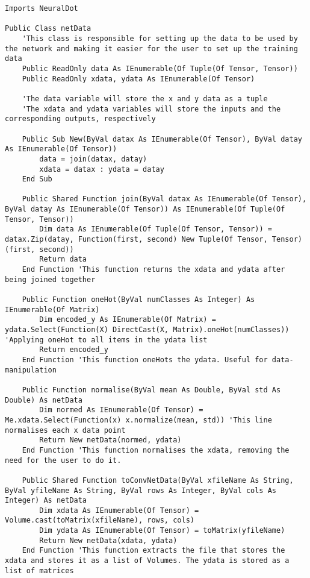 \begin{verbatim}
Imports NeuralDot

Public Class netData
    'This class is responsible for setting up the data to be used by the network and making it easier for the user to set up the training data
    Public ReadOnly data As IEnumerable(Of Tuple(Of Tensor, Tensor))
    Public ReadOnly xdata, ydata As IEnumerable(Of Tensor)

    'The data variable will store the x and y data as a tuple
    'The xdata and ydata variables will store the inputs and the corresponding outputs, respectively

    Public Sub New(ByVal datax As IEnumerable(Of Tensor), ByVal datay As IEnumerable(Of Tensor))
        data = join(datax, datay)
        xdata = datax : ydata = datay
    End Sub

    Public Shared Function join(ByVal datax As IEnumerable(Of Tensor), ByVal datay As IEnumerable(Of Tensor)) As IEnumerable(Of Tuple(Of Tensor, Tensor))
        Dim data As IEnumerable(Of Tuple(Of Tensor, Tensor)) = datax.Zip(datay, Function(first, second) New Tuple(Of Tensor, Tensor)(first, second))
        Return data
    End Function 'This function returns the xdata and ydata after being joined together

    Public Function oneHot(ByVal numClasses As Integer) As IEnumerable(Of Matrix)
        Dim encoded_y As IEnumerable(Of Matrix) = ydata.Select(Function(X) DirectCast(X, Matrix).oneHot(numClasses)) 'Applying oneHot to all items in the ydata list
        Return encoded_y
    End Function 'This function oneHots the ydata. Useful for data-manipulation

    Public Function normalise(ByVal mean As Double, ByVal std As Double) As netData
        Dim normed As IEnumerable(Of Tensor) = Me.xdata.Select(Function(x) x.normalize(mean, std)) 'This line normalises each x data point
        Return New netData(normed, ydata)
    End Function 'This function normalises the xdata, removing the need for the user to do it.

    Public Shared Function toConvNetData(ByVal xfileName As String, ByVal yfileName As String, ByVal rows As Integer, ByVal cols As Integer) As netData
        Dim xdata As IEnumerable(Of Tensor) = Volume.cast(toMatrix(xfileName), rows, cols)
        Dim ydata As IEnumerable(Of Tensor) = toMatrix(yfileName)
        Return New netData(xdata, ydata)
    End Function 'This function extracts the file that stores the xdata and stores it as a list of Volumes. The ydata is stored as a list of matrices


\end{verbatim}

